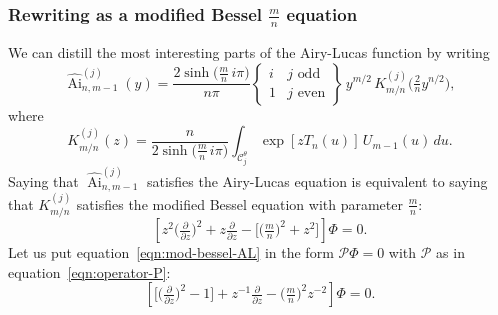 \documentclass{article}
\DeclareMathOperator{\Ai}{Ai}
\theoremstyle{definition}
\theoremstyle{plain}
\begin{document}
\subsubsection{Rewriting as a modified Bessel $\frac{m}{n}$ equation}
We can distill the most interesting parts of the Airy-Lucas function by writing
\[ \widehat{\Ai}^{(j)}_{n, m-1}(y) = \frac{2 \sinh\big(\tfrac{m}{n}\,i\pi\big)}{n\pi} \left\{\begin{array}{ll}i & j \text{ odd} \\ 1 & j \text{ even}\end{array}\right\}\,y^{{m/2}}\,K^{(j)}_{m/n}\big(\tfrac{2}{n} y^{n/2}\big), \]
where
\begin{equation}\label{integral:mod-bessel-rational-AL}
K^{(j)}_{m/n}(z) = \frac{n}{2 \sinh\big(\tfrac{m}{n}\,i\pi\big)}\int_{\mathcal{C}^\theta_j} \exp\left[z T_n(u)\right]\,U_{m-1}(u)\,du.
\end{equation}
Saying that $\widehat{\Ai}^{(j)}_{n, m-1}$ satisfies the Airy-Lucas equation is equivalent to saying that $K^{(j)}_{m/n}$ satisfies the modified Bessel equation with parameter $\frac{m}{n}$:
\begin{equation}\label{eqn:mod-bessel-AL}
\left[z^2 \big(\tfrac{\partial}{\partial z}\big)^2 + z \tfrac{\partial}{\partial z} - \big[\big(\tfrac{m}{n} \big)^2 + z^2\big]\right] \Phi = 0.
\end{equation}
Let us put equation~\eqref{eqn:mod-bessel-AL} in the form $\mathcal{P}\Phi=0$ with $\mathcal{P}$ as in equation~\eqref{eqn:operator-P}:
\begin{equation}\label{eqn:reg-mod-bessel-AL}
\left[ \big[ \big(\tfrac{\partial}{\partial z}\big)^2 - 1 \big] + z^{-1} \tfrac{\partial}{\partial z} - \big({\tfrac{m}{n}}\big)^2 z^{-2} \right] \Phi = 0.
\end{equation}
%
\end{document}

